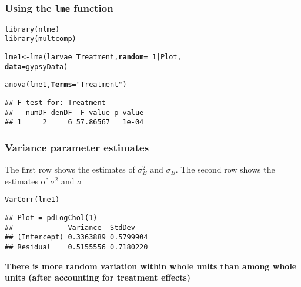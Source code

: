 \documentclass[color=usenames,dvipsnames]{beamer}\usepackage[]{graphicx}\usepackage[]{color}
\makeatletter
\newcommand{\hlnum}[1]{\textcolor[rgb]{0.69,0.494,0}{#1}}%
\newcommand{\hlstr}[1]{\textcolor[rgb]{0.749,0.012,0.012}{#1}}%
\newcommand{\hlopt}[1]{\textcolor[rgb]{0,0,0}{#1}}%
\newcommand{\hlstd}[1]{\textcolor[rgb]{0,0,0}{#1}}%
\newcommand{\hlkwb}[1]{\textcolor[rgb]{0,0.341,0.682}{#1}}%
\newcommand{\hlkwc}[1]{\textcolor[rgb]{0,0,0}{\textbf{#1}}}%
\newcommand{\hlkwd}[1]{\textcolor[rgb]{0.004,0.004,0.506}{#1}}%
\newenvironment{kframe}{%
 \def\at@end@of@kframe{}%
 \ifinner\ifhmode%
  \def\at@end@of@kframe{\end{minipage}}%
  \begin{minipage}{\columnwidth}%
 \fi\fi%
 \def\FrameCommand##1{\hskip\@totalleftmargin \hskip-\fboxsep
 \colorbox{shadecolor}{##1}\hskip-\fboxsep
     \hskip-\linewidth \hskip-\@totalleftmargin \hskip\columnwidth}%
 \MakeFramed {\advance\hsize-\width
   \@totalleftmargin\z@ \linewidth\hsize
   \@setminipage}}%
 {\par\unskip\endMakeFramed%
 \at@end@of@kframe}
\newenvironment{knitrout}{}{} %
\makeatother
\begin{document}
\begin{frame}[fragile]
  \frametitle{Using the {\tt lme} function}
\begin{knitrout}
\color{fgcolor}\begin{kframe}
\begin{alltt}
\hlkwd{library}\hlstd{(nlme)}
\hlkwd{library}\hlstd{(multcomp)}
\end{alltt}


{\ttfamily\noindent\bfseries\color{errorcolor}{\#\# Error in library(multcomp): there is no package called 'multcomp'}}\begin{alltt}
\hlstd{lme1} \hlkwb{<-} \hlkwd{lme}\hlstd{(larvae} \hlopt{~} \hlstd{Treatment,} \hlkwc{random}\hlstd{=}\hlopt{~}\hlnum{1}\hlopt{|}\hlstd{Plot,}
            \hlkwc{data}\hlstd{=gypsyData)}
\end{alltt}
\end{kframe}
\end{knitrout}
\pause
\vfill
\begin{knitrout}
\color{fgcolor}\begin{kframe}
\begin{alltt}
\hlkwd{anova}\hlstd{(lme1,} \hlkwc{Terms}\hlstd{=}\hlstr{"Treatment"}\hlstd{)}
\end{alltt}
\begin{verbatim}
## F-test for: Treatment 
##   numDF denDF  F-value p-value
## 1     2     6 57.86567   1e-04
\end{verbatim}
\end{kframe}
\end{knitrout}
\end{frame}






\begin{frame}[fragile]
  \frametitle{Variance parameter estimates}
  \small
  The first row shows the estimates of $\sigma^2_B$ and
  $\sigma_B$. The second row shows the estimates of $\sigma^2$ and $\sigma$
\begin{knitrout}
\color{fgcolor}\begin{kframe}
\begin{alltt}
\hlkwd{VarCorr}\hlstd{(lme1)}
\end{alltt}
\begin{verbatim}
## Plot = pdLogChol(1) 
##             Variance  StdDev   
## (Intercept) 0.3363889 0.5799904
## Residual    0.5155556 0.7180220
\end{verbatim}
\end{kframe}
\end{knitrout}
 \pause
 \vfill
 \centering
 \bf
  There is more random variation within whole units than among whole
  units (after accounting for treatment effects) \\
\end{frame}
\end{document}
